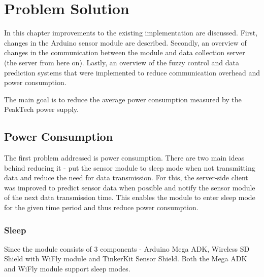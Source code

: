 
\chapter{Problem Solution} %

In this chapter improvements to the existing implementation are discussed. First, changes in the Arduino sensor module are described. Secondly, an overview of changes in the communication between the module and data collection server (the server from here on). Lastly, an overview of the fuzzy control and data prediction systems that were implemented to reduce communication overhead and power consumption.

The main goal is to reduce the average power consumption measured by  the PeakTech power supply. 


\ifpdf
    \graphicspath{{X/figures/PNG/}{X/figures/PDF/}{X/figures/}}
\else
    \graphicspath{{X/figures/EPS/}{X/figures/}}
\fi

\section{Power Consumption}

The first problem addressed is power consumption. There are two main ideas behind reducing it - put the sensor module to sleep mode when not transmitting data and reduce the need for data transmission. For this, the server-side client was improved to predict sensor data when possible and notify the sensor module of the next data transmission time. This enables the module to enter sleep mode for the given time period and thus reduce power consumption. 

\subsection{Sleep}

Since the module consists of 3 components - Arduino Mega ADK, Wireless SD Shield with WiFly module and TinkerKit Sensor Shield. Both the Mega ADK and WiFly module support sleep modes. 

